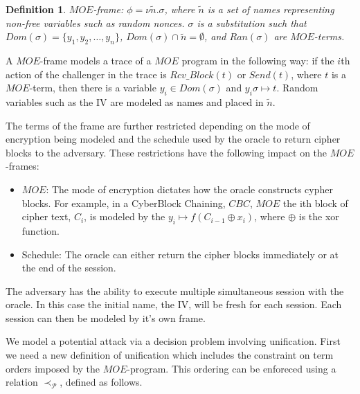 \documentclass[11pt,twoside,a4paper]{article}
\newtheorem{definition}{Definition}
\begin{document}
\begin{definition}
		$MOE$-frame:  $\phi = \nu \tilde{n}.\sigma$, where
		$\tilde{n}$ is a set of names representing non-free variables such as random nonces. $\sigma$ is a substitution
		such that $Dom(\sigma) = \{ y_1, y_2, \ldots, y_n\}$,
		$Dom(\sigma) \cap \tilde{n} = \emptyset$, and
		$Ran(\sigma)$ are $MOE$-terms.  
\end{definition}

A $MOE$-frame models a trace of a $MOE$ program in the following way:
if the $i$th action of the challenger in the trace is 
$Rcv\_Block(t)$ or $Send(t)$, where $t$ is a $MOE$-term, 
then there is a variable $y_i \in Dom(\sigma)$ and 
$y_i \sigma \mapsto t$. Random variables such as the IV are 
modeled as names and placed in $\tilde{n}$.

The terms of the frame are further restricted depending on the mode of encryption being modeled and the schedule used by the oracle to
return cipher blocks to the adversary. These restrictions have
the following impact on the $MOE$-frames:
\begin{itemize}
	\item $MOE$: The mode of encryption dictates how the oracle 
	constructs cypher blocks. For example, in a CyberBlock Chaining,
	$CBC$, $MOE$ the ith block of cipher text, $C_i$, is modeled by
	the $y_i \mapsto f(C_{i-1} \oplus x_i)$, where $\oplus$ is
	the xor function.
	\item Schedule: The oracle can either return the 
	cipher blocks immediately or at the end of the session.  
\end{itemize}

The adversary has the ability to execute multiple simultaneous session with the oracle. In this case the initial name, the IV, will be fresh for each session. Each session can then be modeled by it's own frame. 




We model a potential attack via a decision problem involving unification. First we need a new definition of unification which includes the 
constraint on term orders imposed by the $MOE$-program. This 
ordering can be enforeced using a relation $\prec_{\mathcal{P}}$, defined 
as follows. 
\end{document}
